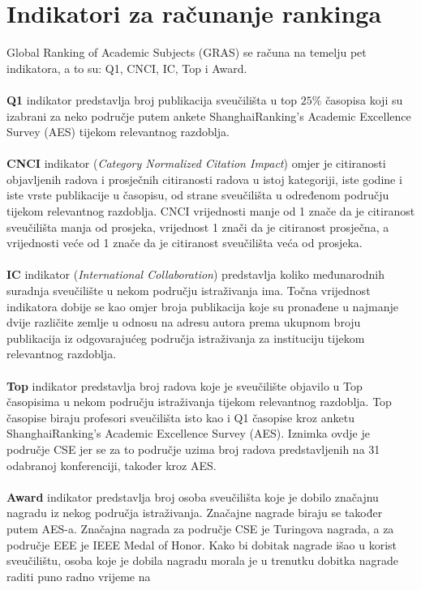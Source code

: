 \documentclass[times, utf8, zavrsni]{fer}
\begin{document}
\section{Indikatori za računanje rankinga}
\label{indikatori}
Global Ranking of Academic Subjects (GRAS) se računa na temelju pet indikatora, a to su: Q1, CNCI, IC, Top i Award.
\\ \\\textbf{Q1} indikator predstavlja broj publikacija sveučilišta u top $25\%$ časopisa koji su izabrani za neko područje putem ankete ShanghaiRanking’s Academic Excellence Survey
(AES) tijekom relevantnog razdoblja.   
\\ \\\textbf{CNCI} indikator (\emph{Category Normalized Citation Impact}) omjer je citiranosti objavljenih radova i prosječnih citiranosti 
radova u istoj kategoriji, iste godine i iste vrste publikacije u časopisu, od strane sveučilišta u određenom području tijekom relevantnog razdoblja.
CNCI vrijednosti manje od 1 znače da je citiranost sveučilišta manja od prosjeka, vrijednost 1 znači da je citiranost prosječna, a vrijednosti veće od
1 znače da je citiranost sveučilišta veća od prosjeka.
\\ \\\textbf{IC} indikator (\emph{International Collaboration}) predstavlja koliko međunarodnih suradnja sveučilište u nekom području istraživanja ima.
Točna vrijednost indikatora dobije se kao omjer broja publikacija koje su pronađene u najmanje dvije različite zemlje 
u odnosu na adresu autora prema ukupnom broju publikacija iz odgovarajućeg područja istraživanja za instituciju tijekom relevantnog razdoblja.
\\ \\\textbf{Top} indikator predstavlja broj radova koje je sveučilište 
objavilo u Top časopisima u nekom području istraživanja tijekom relevantnog razdoblja.
Top časopise biraju profesori sveučilišta isto kao i Q1 časopise kroz anketu ShanghaiRanking’s Academic Excellence Survey (AES). 
Iznimka ovdje je područje CSE jer se za to područje uzima broj radova predstavljenih na 31 odabranoj konferenciji, 
također kroz AES.
\\ \\\textbf{Award} indikator predstavlja broj osoba sveučilišta koje je dobilo značajnu nagradu iz nekog područja istraživanja. Značajne nagrade 
biraju se također putem AES-a. Značajna nagrada za područje CSE je Turingova 
nagrada, a za područje EEE je IEEE Medal of Honor.
Kako bi dobitak nagrade išao u korist sveučilištu, osoba koje je dobila nagradu morala je u trenutku dobitka nagrade raditi puno radno vrijeme na 
\end{document}
